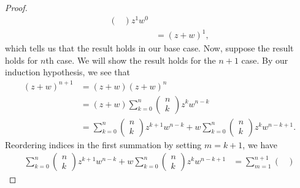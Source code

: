 \documentclass[a4paper]{article}
\begin{document}
\begin{enumerate}
\begin{proof}
\begin{align*}
\begin{pmatrix}
                                          \end{pmatrix} z^{1} w^{0}  \\
                                          &= (z + w)^{1},
        \end{align*}
        which tells us that the result holds in our base case. Now, suppose the result holds for \( n  \)th case. We will show the result holds for the \( n + 1  \) case. By our induction hypothesis, we see that
        \begin{align*}
            (z+w)^{n+1} &= (z+w) (z+w)^{n} \\
                        &= (z+w) \sum_{ k=0  }^{ n } \begin{pmatrix} 
                                   n \\
                                   k 
                                  \end{pmatrix} z^{k} w^{n-k} \\
                        &=  \sum_{ k=0  }^{ n } \begin{pmatrix} 
                                   n \\ 
                                   k 
                                  \end{pmatrix} z^{k+1} w^{n-k} + w \sum_{ k=0  }^{ n } \begin{pmatrix} 
                                             n \\
                                             k 
                                            \end{pmatrix} z^{k} w^{n-k + 1}.  
        \end{align*}
        Reordering indices in the first summation by setting \( m = k +1 \), we have
        \begin{align*}
            \sum_{ k=0  }^{ n } \begin{pmatrix} 
                                   n \\ 
                                   k 
                                  \end{pmatrix} z^{k+1} w^{n-k} + w \sum_{ k=0  }^{ n } \begin{pmatrix} 
                                             n \\
                                             k 
                                            \end{pmatrix} z^{k} w^{n-k + 1} &= \sum_{ m=1  }^{ n+1 } \begin{pmatrix} 

\end{pmatrix}
\end{align*}
\end{proof}
\end{enumerate}
\end{document}
